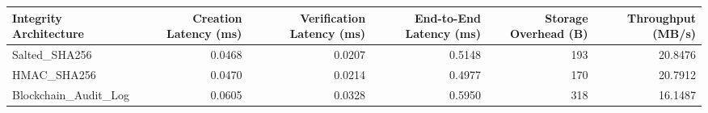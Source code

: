 \begin{tabular}{lrrrrr}
\toprule
Integrity Architecture & Creation Latency (ms) & Verification Latency (ms) & End-to-End Latency (ms) & Storage Overhead (B) & Throughput (MB/s) \\
\midrule
Salted_SHA256 & 0.0468 & 0.0207 & 0.5148 & 193 & 20.8476 \\
HMAC_SHA256 & 0.0470 & 0.0214 & 0.4977 & 170 & 20.7912 \\
Blockchain_Audit_Log & 0.0605 & 0.0328 & 0.5950 & 318 & 16.1487 \\
\bottomrule
\end{tabular}
